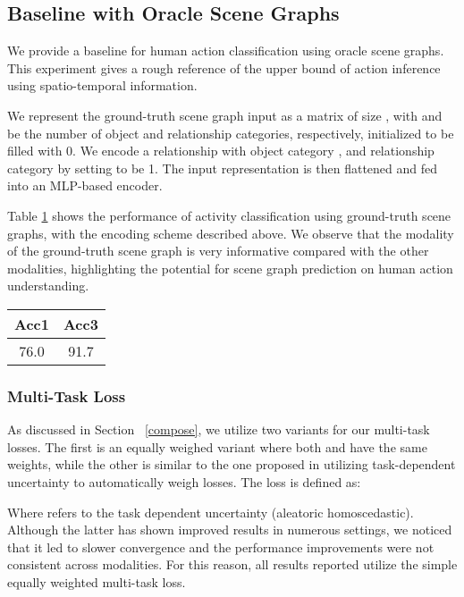 \documentclass[final]{cvpr}
\begin{document}
\subsection*{Baseline with Oracle Scene Graphs}

We provide a baseline for human action classification using oracle scene graphs. This experiment gives a rough reference of the upper bound of action inference using spatio-temporal information.

We represent the ground-truth scene graph input as a matrix  of size , with  and  be the number of object and relationship categories, respectively, initialized to be filled with 0. We encode a relationship with object category , and relationship category  by setting  to be 1. The input representation is then flattened and fed into an MLP-based encoder.

Table \ref{table:sg} shows the performance of activity classification using ground-truth scene graphs, with the encoding scheme described above. We observe that the modality of the ground-truth scene graph is very informative compared with the other modalities, highlighting the potential for scene graph prediction on human action understanding.

\begin{table}[hbt!]
  \centering
    \begin{tabular}{c|c} 
     \toprule
      Acc1 & Acc3\\
     \midrule
      76.0 & 91.7 \\
     \bottomrule
    \end{tabular}
    \label{table:sg}
\end{table}

\subsubsection*{Multi-Task Loss}

As discussed in Section ~\ref{compose}, we utilize two variants for our multi-task losses. The first is an equally weighed variant where both  and  have the same weights, while the other is similar to the one proposed in \cite{kendall2018multi} utilizing task-dependent uncertainty to automatically weigh losses. The loss is defined as:



Where  refers to the task dependent uncertainty (aleatoric homoscedastic). Although the latter has shown improved results in numerous settings, we noticed that it led to slower convergence and the performance improvements were not consistent across modalities. For this reason, all results reported utilize the simple equally weighted multi-task loss.
\end{document}
